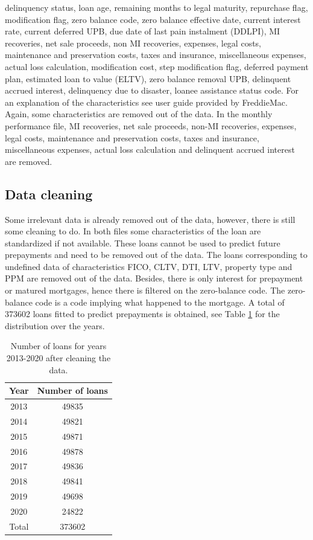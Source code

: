     delinquency status, loan age, remaining months to legal maturity, 
    repurchase flag, modification flag, zero balance code, zero 
    balance effective date, current interest rate, current deferred 
    UPB, due date of last pain instalment (DDLPI), MI recoveries, net 
    sale  proceeds, non MI recoveries, expenses, legal costs, 
    maintenance and preservation costs, taxes and insurance, 
    miscellaneous expenses, actual loss calculation, modification cost, 
    step modification flag, deferred payment plan, estimated loan to 
    value (ELTV), zero balance removal UPB, delinquent accrued interest, 
    delinquency due to disaster, loanee assistance status code. 
    For an explanation of the characteristics see user guide provided 
    by FreddieMac. Again, some characteristics are removed out of the 
    data. In the monthly performance file, MI recoveries, net sale 
    proceeds, non-MI recoveries, expenses, legal costs, maintenance 
    and preservation costs, taxes and insurance, miscellaneous 
    expenses, actual loss calculation and delinquent accrued interest 
    are removed. 

\subsection{Data cleaning}
	Some irrelevant data is already removed out of the data, 
    however, there is still some cleaning to do. In both files some 
    characteristics of the loan are standardized if not available. 
    These loans cannot be used to predict future prepayments and need 
    to be removed out of the data. The loans corresponding to undefined 
    data of characteristics FICO, CLTV, DTI, LTV, property type and PPM 
    are removed out of the data. Besides, there is only interest for 
    prepayment or matured mortgages, hence there is filtered on the 
    zero-balance code. The zero-balance code is a code implying what 
    happened to the mortgage. A total of 373602 loans fitted to 
    predict prepayments is obtained, see Table 
    \ref{model_cleaned data_table} for the distribution over the 
    years. 
    \begin{table}[H]
        \centering
        \begin{tabular}{c|c}
            Year & Number of loans \\\hline
            2013 & 49835 \\
            2014 & 49821 \\
            2015 & 49871 \\
            2016 & 49878 \\
            2017 & 49836 \\
            2018 & 49841 \\
            2019 & 49698 \\
            2020 & 24822 \\\hline
            Total & 373602 
		\end{tabular}
		\caption{
            Number of loans for years 2013-2020 after 
            cleaning the data.
            }
		\label{model_cleaned data_table}
    \end{table}
    
